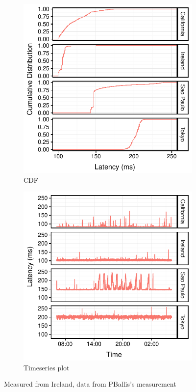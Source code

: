 \begin{figure}
  \centering
  \begin{subfigure}{.48\columnwidth}
    \centering
    \includegraphics[width=.95\linewidth]{figures/latency-cdf.pdf}
    \caption{CDF}
    \label{fig:bar}
  \end{subfigure}
  \begin{subfigure}{.48\columnwidth}
    \centering
    \includegraphics[width=.95\linewidth]{figures/latency-ts.pdf}
    \caption{Timeseries plot}
    \label{fig:ts}
  \end{subfigure}
  \caption{Measured from Ireland, data from PBallis's measurement}
  \label{fig:bw}
\end{figure}

